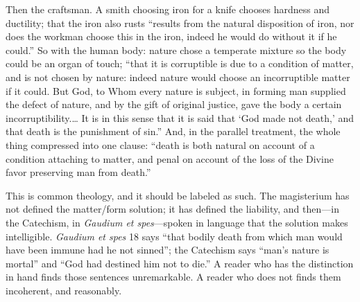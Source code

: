 Then the craftsman. A smith choosing iron for a knife chooses hardness and ductility; that the iron also rusts ``results from the natural disposition of iron, nor does the workman choose this in the iron, indeed he would do without it if he could.'' So with the human body: nature chose a temperate mixture so the body could be an organ of touch; ``that it is corruptible is due to a condition of matter, and is not chosen by nature: indeed nature would choose an incorruptible matter if it could. But God, to Whom every nature is subject, in forming man supplied the defect of nature, and by the gift of original justice, gave the body a certain incorruptibility.\ldots{} It is in this sense that it is said that `God made not death,' and that death is the punishment of sin.'' And, in the parallel treatment, the whole thing compressed into one clause: ``death is both natural on account of a condition attaching to matter, and penal on account of the loss of the Divine favor preserving man from death.''

This is common theology, and it should be labeled as such. The magisterium has not defined the matter/form solution; it has defined the liability, and then---in the Catechism, in \emph{Gaudium et spes}---spoken in language that the solution makes intelligible. \emph{Gaudium et spes} 18 says ``that bodily death from which man would have been immune had he not sinned''; the Catechism says ``man's nature is mortal'' and ``God had destined him not to die.'' A reader who has the distinction in hand finds those sentences unremarkable. A reader who does not finds them incoherent, and reasonably.

